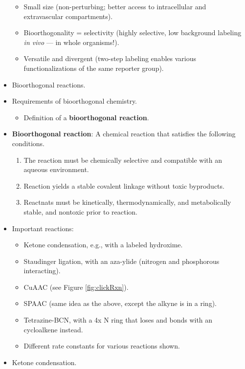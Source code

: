 \documentclass[../notes.tex]{subfiles}
\begin{document}
\begin{itemize}
\begin{itemize}
        \item Small size (non-perturbing; better access to intracellular and extravascular compartments).
        \item Bioorthogonality = selectivity (highly selective, low background labeling \emph{in vivo} --- in whole organisms!).
        \item Versatile and divergent (two-step labeling enables various functionalizations of the same reporter group).
    \end{itemize}
    \item Bioorthogonal reactions.
    \item Requirements of bioorthogonal chemistry.
    \begin{itemize}
        \item Definition of a \textbf{bioorthogonal reaction}.
    \end{itemize}
    \item \textbf{Bioorthogonal reaction}: A chemical reaction that satisfies the following conditions.
    \begin{enumerate}
        \item The reaction must be chemically selective and compatible with an aqueous environment.
        \item Reaction yields a stable covalent linkage without toxic byproducts.
        \item Reactnats must be kinetically, thermodynamically, and metabolically stable, and nontoxic prior to reaction.
    \end{enumerate}
    \item Important reactions:
    \begin{itemize}
        \item Ketone condensation, e.g., with a labeled hydroxime.
        \item Staudinger ligation, with an aza-ylide (nitrogen and phosphorous interacting).
        \item CuAAC (see Figure \ref{fig:clickRxn}).
        \item SPAAC (same idea as the above, except the alkyne is in a ring).
        \item Tetrazine-BCN, with a 4x N ring that loses  and bonds with an cycloalkene instead.
        \item Different rate constants for various reactions shown.
    \end{itemize}
    \item Ketone condensation.
    \begin{itemize}

\end{itemize}
\end{itemize}
\end{document}
